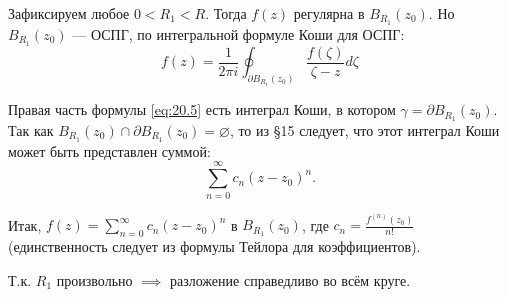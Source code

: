 \begin{tproof}
    Зафиксируем любое $0 < R_1 < R$. Тогда $f(z)$ регулярна в $B_{R_1}(z_0)$.
    Но $B_{R_1}(z_0)$ — ОСПГ, по интегральной формуле Коши для ОСПГ:
    \begin{equation} \label{eq:20.5}
        f(z) = \frac{1}{2\pi i} \oint_{\partial B_{R_1}(z_0)} \frac{f(\zeta)}{\zeta - z} d\zeta
    \end{equation}
    
    Правая часть формулы \eqref{eq:20.5} есть интеграл Коши, в котором $\gamma = \partial B_{R_1}(z_0)$.
    Так как $B_{R_1}(z_0) \cap \partial B_{R_1}(z_0) = \varnothing$, то из §15 следует, что этот интеграл Коши может быть представлен суммой:
    \[
        \sum_{n=0}^{\infty} c_n (z - z_0)^n.
    \]
    
    Итак, $f(z) = \sum_{n=0}^{\infty} c_n (z - z_0)^n$ в $B_{R_1}(z_0)$, где $c_n = \frac{f^{(n)}(z_0)}{n!}$ (единственность следует из формулы Тейлора для коэффициентов).
    
    Т.к. $R_1$ произвольно $\implies$ разложение справедливо во всём круге.
\end{tproof}